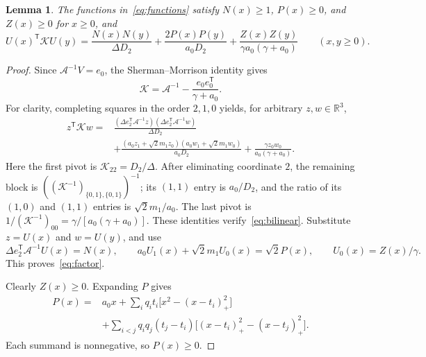 \documentclass[11pt]{article}
\newtheorem{lemma}[theorem]{Lemma}
\theoremstyle{remark}
\newcommand{\R}{\mathbb R}
\begin{document}
\begin{lemma}\label{lem:kernel}
The functions in~\eqref{eq:functions} satisfy $N(x)\ge1$, $P(x)\ge0$, and
$Z(x)\ge0$ for $x\ge0$, and
\begin{equation}\label{eq:factor}
 U(x)^{\mathsf T}\mathcal K U(y)
 =\frac{N(x)N(y)}{\Delta D_2}
  +\frac{2P(x)P(y)}{a_0D_2}
  +\frac{Z(x)Z(y)}{\gamma a_0(\gamma+a_0)}
 \qquad(x,y\ge0).
\end{equation}
\end{lemma}
\begin{proof}
Since $\mathcal A^{-1}V=e_0$, the Sherman--Morrison identity gives
\[
 \mathcal K=\mathcal A^{-1}-\frac{e_0e_0^{\mathsf T}}{\gamma+a_0}.
\]
For clarity, completing squares in the order $2,1,0$ yields, for arbitrary
$z,w\in\R^3$,
\begin{equation}\label{eq:bilinear}
\begin{aligned}
 z^{\mathsf T}\mathcal K w
 ={}&\frac{(\Delta e_2^{\mathsf T}\mathcal A^{-1}z)
              (\Delta e_2^{\mathsf T}\mathcal A^{-1}w)}{\Delta D_2}\\
 &+\frac{(a_0z_1+\sqrt2m_1z_0)(a_0w_1+\sqrt2m_1w_0)}{a_0D_2}
  +\frac{\gamma z_0w_0}{a_0(\gamma+a_0)}.
\end{aligned}
\end{equation}
Here the first pivot is $\mathcal K_{22}=D_2/\Delta$.
After eliminating coordinate $2$, the remaining block is
$((\mathcal K^{-1})_{\{0,1\},\{0,1\}})^{-1}$; its $(1,1)$ entry is
$a_0/D_2$, and the ratio of its $(1,0)$ and $(1,1)$ entries is
$\sqrt2m_1/a_0$. The last pivot is
$1/(\mathcal K^{-1})_{00}=\gamma/[a_0(\gamma+a_0)]$.
These identities verify~\eqref{eq:bilinear}.
Substitute $z=U(x)$ and $w=U(y)$, and use
\[
 \Delta e_2^{\mathsf T}\mathcal A^{-1}U(x)=N(x),\qquad
 a_0U_1(x)+\sqrt2m_1U_0(x)=\sqrt2P(x),\qquad U_0(x)=Z(x)/\gamma.
\]
This proves~\eqref{eq:factor}.

Clearly $Z(x)\ge0$. Expanding $P$ gives
\[
\begin{aligned}
 P(x)={}&a_0x+\sum_iq_it_i\bigl[x^2-(x-t_i)_+^2\bigr]\\
 &+\sum_{i<j}q_iq_j(t_j-t_i)
       \bigl[(x-t_i)_+^2-(x-t_j)_+^2\bigr].
\end{aligned}
\]
Each summand is nonnegative, so $P(x)\ge0$.


\end{proof}
\end{document}
